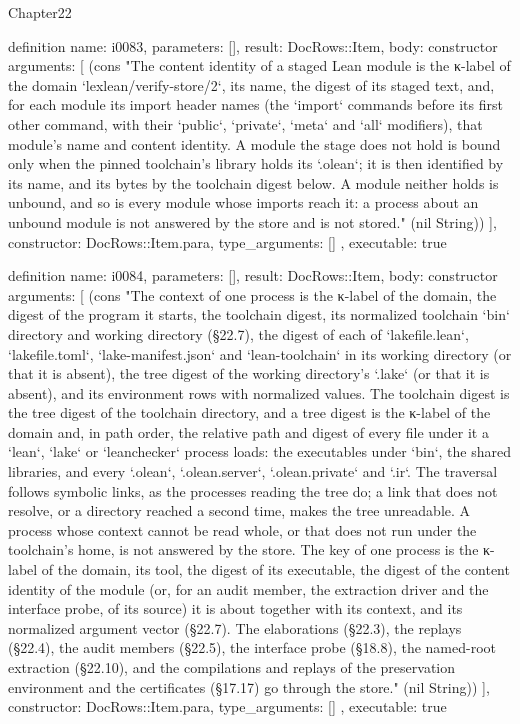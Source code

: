 \begin{lexlean}{Chapter22}
\begin{semanticmodule}
definition{
  name: i0083,
  parameters: [],
  result: DocRows::Item,
  body: constructor{
    arguments: [
      (cons "The content identity of a staged Lean module is the κ-label of the domain `lexlean/verify-store/2`, its name, the digest of its staged text, and, for each module its import header names (the `import` commands before its first other command, with their `public`, `private`, `meta` and `all` modifiers), that module's name and content identity. A module the stage does not hold is bound only when the pinned toolchain's library holds its `.olean`; it is then identified by its name, and its bytes by the toolchain digest below. A module neither holds is unbound, and so is every module whose imports reach it: a process about an unbound module is not answered by the store and is not stored." (nil String))
    ],
    constructor: DocRows::Item.para,
    type_arguments: []
  },
  executable: true
}

definition{
  name: i0084,
  parameters: [],
  result: DocRows::Item,
  body: constructor{
    arguments: [
      (cons "The context of one process is the κ-label of the domain, the digest of the program it starts, the toolchain digest, its normalized toolchain `bin` directory and working directory (§22.7), the digest of each of `lakefile.lean`, `lakefile.toml`, `lake-manifest.json` and `lean-toolchain` in its working directory (or that it is absent), the tree digest of the working directory's `.lake` (or that it is absent), and its environment rows with normalized values. The toolchain digest is the tree digest of the toolchain directory, and a tree digest is the κ-label of the domain and, in path order, the relative path and digest of every file under it a `lean`, `lake` or `leanchecker` process loads: the executables under `bin`, the shared libraries, and every `.olean`, `.olean.server`, `.olean.private` and `.ir`. The traversal follows symbolic links, as the processes reading the tree do; a link that does not resolve, or a directory reached a second time, makes the tree unreadable. A process whose context cannot be read whole, or that does not run under the toolchain's home, is not answered by the store. The key of one process is the κ-label of the domain, its tool, the digest of its executable, the digest of the content identity of the module (or, for an audit member, the extraction driver and the interface probe, of its source) it is about together with its context, and its normalized argument vector (§22.7). The elaborations (§22.3), the replays (§22.4), the audit members (§22.5), the interface probe (§18.8), the named-root extraction (§22.10), and the compilations and replays of the preservation environment and the certificates (§17.17) go through the store." (nil String))
    ],
    constructor: DocRows::Item.para,
    type_arguments: []
  },
  executable: true
}


\end{semanticmodule}
\end{lexlean}
